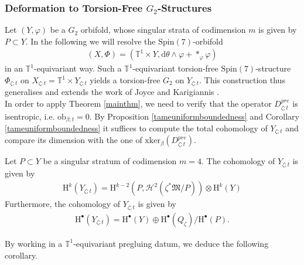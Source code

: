 \documentclass[psamsfonts]{amsart}
\theoremstyle{plain}
\theoremstyle{definition}{
\newtheorem{defi}{Definition}[section]
\newtheorem{ass}{Assumption}
\newtheorem*{nota}{Notation}}
\theoremstyle{remark}{
\newtheorem{rem}{Remark}
\newtheorem{ex}{Example}}
\theoremstyle{plain}{
\newtheorem{thm}{Theorem}[section]
\newtheorem{lem}{Lemma}[section]
\newtheorem{cor}{Corollary}[section]
\newtheorem{prop}{Proposition}[section]
\newtheorem{con}{Conjecture}[section]}
\newcommand{\m}[1]{{\mathrm{#1}}}
\begin{document}
\subsubsection{Deformation to Torsion-Free $G_2$-Structures}
\label{Deformation to Torsion-Free G2 Structures}

Let $(Y,\varphi)$ be a $G_2$ orbifold, whose singular strata of codimension $m$ is given by $P\subset Y$. In the following we will resolve the $\m{Spin}(7)$-orbifold 
\begin{align*}
    (X,\Phi)=(\mathbb{T}^1\times Y ,\m{d}\theta\wedge\varphi+*_{\varphi}\varphi)
\end{align*}
in an $\mathbb{T}^1$-equivariant way. Such a $\mathbb{T}^1$-equivariant torsion-free $\m{Spin}(7)$-structure $\Phi_{\zeta;t}$ on $X_{\zeta;t}=\mathbb{T}^1\times Y_{\zeta;t}$ yields a torsion-free $G_2$ on $Y_{\zeta;t}$. This construction thus generalises and extends the work of Joyce and Karigiannis \cite{joyce2017new}.\\

In order to apply Theorem \ref{mainthm}, we need to verify that the operator $D^{pre}_{\zeta;t}$ is isentropic, i.e. $\m{ob}_{\beta;t}=0$. By Proposition \ref{tameuniformboundedness} and Corollary \ref{tameuniformboundedness} it suffices to compute the total cohomology of $Y_{\zeta;t}$ and compare its dimension with the one of $\m{xker}_\beta(D^{pre}_{\zeta;t})$.\\

\begin{lem}
Let $P\subset Y$ be a singular stratum of codimension $m=4$. The cohomology of $Y_{\zeta;t}$ is given by 
\begin{align*}
    \m{H}^k(Y_{\zeta;t})=\m{H}^{k-2}(P,\mathcal{H}^2(\zeta^*\mathfrak{M}/P))\otimes \m{H}^k(Y)
\end{align*}
Furthermore, the cohomology of $Y_{\zeta;t}$ is given by 
\begin{align*}
    \m{H}^\bullet(Y_{\zeta;t})=\m{H}^\bullet(Y)\oplus\m{H}^\bullet(Q_\zeta)/\m{H}^\bullet(P).
\end{align*}
\end{lem}


By working in a $\mathbb{T}^1$-equivariant pregluing datum, we deduce the following corollary.
\end{document}
